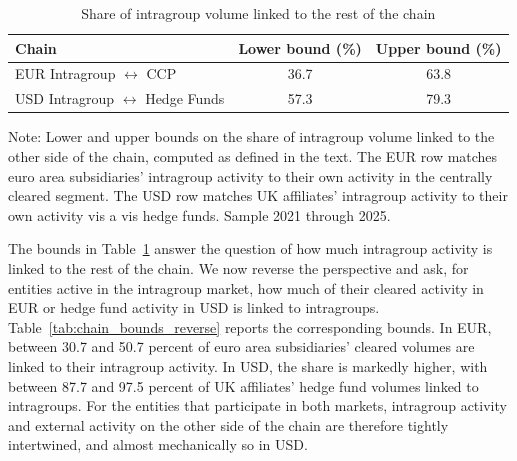 \documentclass[english, 11pt, oneside, legal]{article}
\begin{document}
\begin{table}[t]
    \centering
    \caption{Share of intragroup volume linked to the rest of the chain}
    \label{tab:chain_bounds}
    \begin{tabular}{lcc}
        \hline
        Chain & Lower bound (\%) & Upper bound (\%) \\
        \hline
        EUR Intragroup $\leftrightarrow$ CCP          & 36.7 & 63.8 \\
        USD Intragroup $\leftrightarrow$ Hedge Funds  & 57.3 & 79.3 \\
        \hline
    \end{tabular}
    \begin{flushleft}
        \footnotesize Note: Lower and upper bounds on the share of intragroup volume linked to the other side of the chain, computed as defined in the text. The EUR row matches euro area subsidiaries' intragroup activity to their own activity in the centrally cleared segment. The USD row matches UK affiliates' intragroup activity to their own activity vis a vis hedge funds. Sample 2021 through 2025.
    \end{flushleft}
\end{table}


The bounds in Table~\ref{tab:chain_bounds} answer the question of how much intragroup activity is linked to the rest of the chain. We now reverse the perspective and ask, for entities active in the intragroup market, how much of their cleared activity in EUR or hedge fund activity in USD is linked to intragroups. Table~\ref{tab:chain_bounds_reverse} reports the corresponding bounds. In EUR, between 30.7 and 50.7 percent of euro area subsidiaries' cleared volumes are linked to their intragroup activity. In USD, the share is markedly higher, with between 87.7 and 97.5 percent of UK affiliates' hedge fund volumes linked to intragroups. For the entities that participate in both markets, intragroup activity and external activity on the other side of the chain are therefore tightly intertwined, and almost mechanically so in USD. 
\end{document}
